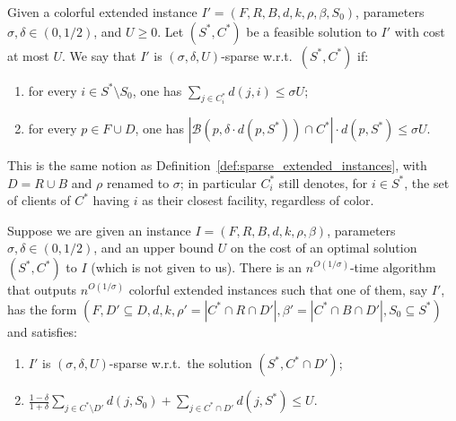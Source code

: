\begin{definition}
    \label{def:sparse_extended_instances_col}
Given a colorful extended instance $I' = (F,R,B,d,k,\rho,\beta,S_0)$, parameters $\sigma, \delta \in (0, 1/2)$, and $U \ge 0$. Let $(S^*, C^*)$ be a feasible solution to $I'$ with cost at most $U$. We say that $I'$ is $(\sigma, \delta, U)$-sparse w.r.t.\ $(S^*, C^*)$ if:
\begin{enumerate}[label=\thedefinition\alph*)]
    \item \label{def:sparse_col_a} for every $i \in S^* \setminus S_0$, one has $\sum_{j \in C_i^*} d(j, i) \leq \sigma U$;
    \item \label{def:sparse_col_b} for every $p \in F \cup D$, one has $|\mathcal{B}(p, \delta \cdot d(p, S^*)) \cap C^*| \cdot d(p, S^*) \leq \sigma U$.
\end{enumerate}
\end{definition}

This is the same notion as Definition~\ref{def:sparse_extended_instances}, with $D = R \cup B$ and $\rho$ renamed to $\sigma$; in particular $C_i^*$ still denotes, for $i \in S^*$, the set of clients of $C^*$ having $i$ as their closest facility, regardless of color.

\begin{theorem}
\label{thm:sparsification_col}
Suppose we are given an instance $I = (F, R, B, d, k, \rho, \beta)$, parameters $\sigma, \delta \in (0, 1/2)$, and an upper bound $U$ on the cost of an optimal solution $(S^*, C^*)$ to $I$ (which is not given to us). There is an $n^{O(1/\sigma)}$-time algorithm that outputs $n^{O(1/\sigma)}$ colorful extended instances such that one of them, say $I'$, has the form $(F, D' \subseteq D, d, k, \rho' = |C^* \cap R \cap D'|, \beta' = |C^* \cap B \cap D'|, S_0 \subseteq S^*)$ and satisfies:
\begin{enumerate}[label=\thedefinition\alph*)]
    \item \label{thm:sparsification_col_a} $I'$ is $(\sigma, \delta, U)$-sparse w.r.t.\ the solution $(S^*, C^* \cap D')$;
    \item \label{thm:sparsification_col_b} $\frac{1-\delta}{1+\delta} \sum_{j \in C^* \setminus D'} d(j, S_0) + \sum_{j \in C^* \cap D'} d(j, S^*) \leq U$.
\end{enumerate}
\end{theorem}


